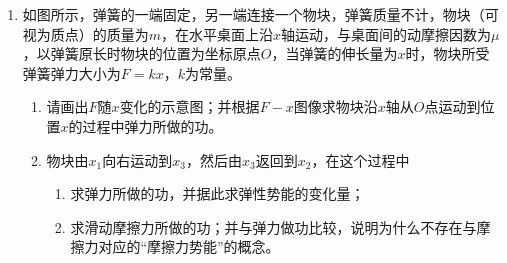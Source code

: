 \begin{enumerate}[leftmargin=0em]
\newpage
\item 
{}
如图所示，弹簧的一端固定，另一端连接一个物块，弹簧质量不计，物块（可视为质点）的质量为$ m $，在水平桌面上沿$ x $轴运动，与桌面间的动摩擦因数为$ \mu $，以弹簧原长时物块的位置为坐标原点$ O $，当弹簧的伸长量为$ x $时，物块所受弹簧弹力大小为$ F=kx $，$ k $为常量。
\begin{enumerate}
\renewcommand{\labelenumi}{\arabic{enumi}.}
\item
请画出$ F $随$ x $变化的示意图；并根据$ F-x $图像求物块沿$ x $轴从$ O $点运动到位置$ x $的过程中弹力所做的功。
\item 
物块由$ x_{1} $向右运动到$ x_{3} $，然后由$ x_{3} $返回到$ x_{2} $，在这个过程中
\begin{enumerate}
\renewcommand{\labelenumiii}{\alph{enumiii}.}
\item
求弹力所做的功，并据此求弹性势能的变化量；
\item 
求滑动摩擦力所做的功；并与弹力做功比较，说明为什么不存在与摩擦力对应的“摩擦力势能”的概念。




\end{enumerate}
\begin{figure}[h!]
\flushright

\end{figure}





\end{enumerate}


\end{enumerate}
